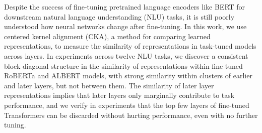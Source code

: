 Despite the success of fine-tuning pretrained language encoders like BERT for downstream natural language understanding (NLU) tasks, it is still poorly understood how neural networks change after fine-tuning. In this work, we use centered kernel alignment (CKA), a method for comparing learned representations, to measure the similarity of representations in task-tuned models across layers. In experiments across twelve NLU tasks, we discover a consistent block diagonal structure in the similarity of representations within fine-tuned RoBERTa and ALBERT models, with strong similarity within clusters of earlier and later layers, but not between them. The similarity of later layer representations implies that later layers only marginally contribute to task performance, and we verify in experiments that the top few layers of fine-tuned Transformers can be discarded without hurting performance, even with no further tuning.
